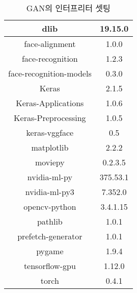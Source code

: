 \documentclass{oblivoir}
\begin{document}
\begin{table}[h!]
    \centering
        \begin{tabular}{|c|c|}
            \hline\hline
            dlib & 19.15.0 \\ \hline
            face-alignment & 1.0.0  \\ \hline
            face-recognition & 1.2.3  \\ \hline
            face-recognition-models & 0.3.0  \\ \hline
            Keras & 2.1.5  \\ \hline
            Keras-Applications & 1.0.6  \\ \hline
            Keras-Preprocessing & 1.0.5  \\ \hline
            keras-vggface  & 0.5  \\ \hline
            matplotlib & 2.2.2  \\ \hline
            moviepy & 0.2.3.5  \\ \hline
            nvidia-ml-py &  375.53.1  \\ \hline
            nvidia-ml-py3 &  7.352.0  \\ \hline
            opencv-python & 3.4.1.15  \\ \hline
            pathlib & 1.0.1 \\ \hline 
            prefetch-generator &  1.0.1  \\ \hline
            pygame & 1.9.4  \\ \hline
            tensorflow-gpu &  1.12.0  \\ \hline
            torch & 0.4.1  \\ \hline
            \hline\hline
        \end{tabular}
	\caption{GAN의 인터프리터 셋팅 }
\end{table}
\end{document}
